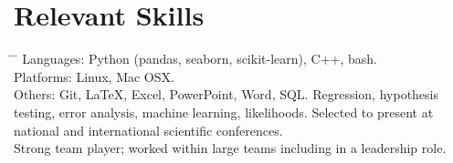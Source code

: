 \documentclass[10pt]{article} %
\begin{document}
\vspace{-1mm}
\section{Relevant Skills}
\begin{tabbing}
  \hspace{3mm} \= \hspace{30mm} \= \kill 
        {
          Languages: Python (pandas, seaborn, scikit-learn), C++, bash. \\
          \>\>Platforms: Linux, Mac OSX. \\
          \>\>Others: Git, LaTeX, Excel, PowerPoint, Word, SQL.
        }
    { Regression, hypothesis testing, error analysis, machine learning, likelihoods. }
        {
          Selected to present at national and international scientific conferences.\\
          \>\>Strong team player; worked within large teams including in a leadership role.
        }
\end{tabbing}


\vspace{-9mm}
\end{document}
